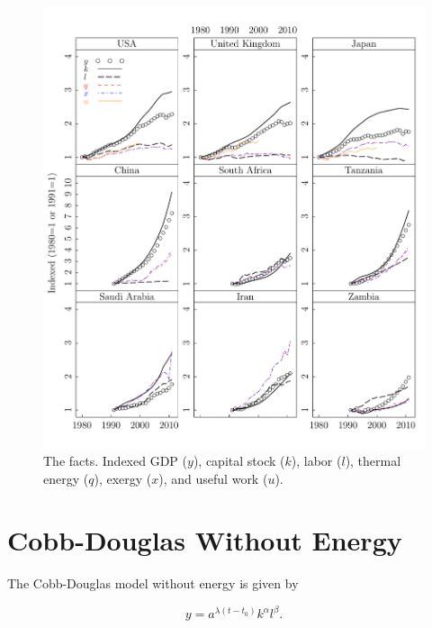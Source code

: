 \documentclass[preprint,authoryear,12pt]{elsarticle}\usepackage{graphicx, color}
\makeatletter
\def\maxwidth{ %
  \ifdim\Gin@nat@width>\linewidth
    \linewidth
  \else
    \Gin@nat@width
  \fi
}
\newenvironment{knitrout}{}{} %
\makeatother
\begin{document}
\begin{knitrout}
\color{fgcolor}\begin{figure}[]

\includegraphics[width=\maxwidth]{figure/Factors_Lattice_Graph} \caption[The facts]{The facts. Indexed GDP ($y$), capital stock ($k$), labor ($l$), thermal energy ($q$), exergy ($x$), and useful work ($u$).\label{fig:Factors_Lattice_Graph}}
\end{figure}


\end{knitrout}


\section{Cobb-Douglas Without Energy}




The Cobb-Douglas model without energy is given by

\begin{equation} \label{eq:CD_No_Energy}
  y = a^{\lambda (t-t_0)}k^{\alpha}l^{\beta}.
\end{equation}
\end{document}
